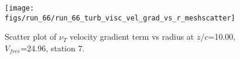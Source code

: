 \begin{figure}[H]
\centering
\texttt{[image: figs/run\_66/run\_66\_turb\_visc\_vel\_grad\_vs\_r\_meshscatter]}
\caption{Scatter plot of $\nu_T$ velocity gradient term vs radius at $z/c$=10.00, $V_{free}$=24.96, station 7.}
\label{fig:run_66_turb_visc_vel_grad_vs_r_meshscatter}
\end{figure}


